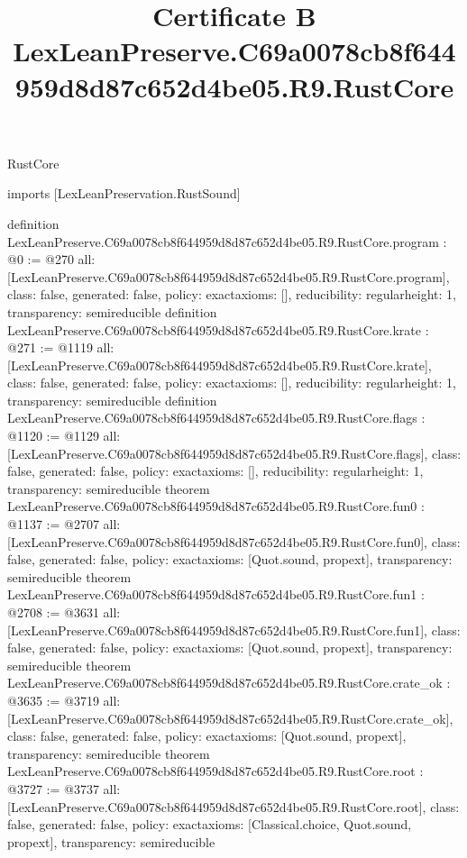 \begin{lexlean}{RustCore}
\title{Certificate B LexLeanPreserve.C69a0078cb8f644959d8d87c652d4be05.R9.RustCore}
\begin{coremodule}
imports [LexLeanPreservation.RustSound]

definition LexLeanPreserve.C69a0078cb8f644959d8d87c652d4be05.R9.RustCore.program : @0 := @270 {
  all: [LexLeanPreserve.C69a0078cb8f644959d8d87c652d4be05.R9.RustCore.program],
  class: false,
  generated: false,
  policy: exact{axioms: []},
  reducibility: regular{height: 1},
  transparency: semireducible
}
definition LexLeanPreserve.C69a0078cb8f644959d8d87c652d4be05.R9.RustCore.krate : @271 := @1119 {
  all: [LexLeanPreserve.C69a0078cb8f644959d8d87c652d4be05.R9.RustCore.krate],
  class: false,
  generated: false,
  policy: exact{axioms: []},
  reducibility: regular{height: 1},
  transparency: semireducible
}
definition LexLeanPreserve.C69a0078cb8f644959d8d87c652d4be05.R9.RustCore.flags : @1120 := @1129 {
  all: [LexLeanPreserve.C69a0078cb8f644959d8d87c652d4be05.R9.RustCore.flags],
  class: false,
  generated: false,
  policy: exact{axioms: []},
  reducibility: regular{height: 1},
  transparency: semireducible
}
theorem LexLeanPreserve.C69a0078cb8f644959d8d87c652d4be05.R9.RustCore.fun0 : @1137 := @2707 {
  all: [LexLeanPreserve.C69a0078cb8f644959d8d87c652d4be05.R9.RustCore.fun0],
  class: false,
  generated: false,
  policy: exact{axioms: [Quot.sound, propext]},
  transparency: semireducible
}
theorem LexLeanPreserve.C69a0078cb8f644959d8d87c652d4be05.R9.RustCore.fun1 : @2708 := @3631 {
  all: [LexLeanPreserve.C69a0078cb8f644959d8d87c652d4be05.R9.RustCore.fun1],
  class: false,
  generated: false,
  policy: exact{axioms: [Quot.sound, propext]},
  transparency: semireducible
}
theorem LexLeanPreserve.C69a0078cb8f644959d8d87c652d4be05.R9.RustCore.crate_ok : @3635 := @3719 {
  all: [LexLeanPreserve.C69a0078cb8f644959d8d87c652d4be05.R9.RustCore.crate_ok],
  class: false,
  generated: false,
  policy: exact{axioms: [Quot.sound, propext]},
  transparency: semireducible
}
theorem LexLeanPreserve.C69a0078cb8f644959d8d87c652d4be05.R9.RustCore.root : @3727 := @3737 {
  all: [LexLeanPreserve.C69a0078cb8f644959d8d87c652d4be05.R9.RustCore.root],
  class: false,
  generated: false,
  policy: exact{axioms: [Classical.choice, Quot.sound, propext]},
  transparency: semireducible
}


\end{coremodule}
\end{lexlean}
